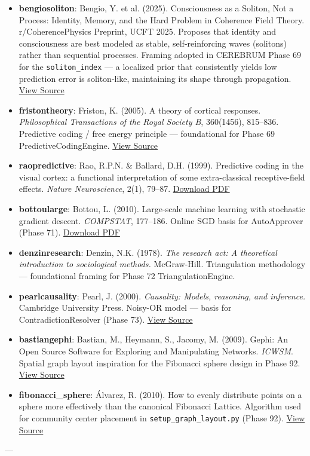 \begin{itemize}
\item \textbf{bengio\-soliton}: Bengio, Y. et al. (2025). Consci\-ousness as a Soliton, Not a Process: Identity, Memory, and the Hard Problem in Coherence Field Theory. r/CoherencePhysics Preprint, UCFT 2025. Proposes that identity and consc\-iousness are best modeled as stable, self-reinforcing waves (solitons) rather than sequential processes. Framing adopted in CEREBRUM Phase 69 for the \texttt{soliton\_index} — a localized prior that consi\-stently yields low prediction error is soliton-like, maintaining its shape through propagation. \href{https://www.reddit.com/r/CoherencePhysics/comments/1sh749z/consciousness_as_a_soliton_not_a_process_identity/}{View Source}
\item \textbf{friston\-theory}: Friston, K. (2005). A theory of cortical responses. \textit{Philos\-ophical Transa\-ctions of the Royal Society B}, 360(1456), 815–836. Predictive coding / free energy principle — found\-ational for Phase 69 PredictiveCodingEngine. \href{https://doi.org/10.1098/rstb.2005.1622}{View Source}
\item \textbf{rao\-predi\-ctive}: Rao, R.P.N. \& Ballard, D.H. (1999). Predictive coding in the visual cortex: a functional inter\-pretation of some extra-classical receptive-field effects. \textit{Nature Neuros\-cience}, 2(1), 79–87. \href{https://www.nature.com/articles/nn0199_79.pdf}{Download PDF}
\item \textbf{bottou\-large}: Bottou, L. (2010). Large-scale machine learning with stochastic gradient descent. \textit{COMPSTAT}, 177–186. Online SGD basis for AutoApprover (Phase 71). \href{https://link.springer.com/content/pdf/10.1007/978-3-7908-2604-3_16.pdf}{Download PDF}
\item \textbf{denzin\-research}: Denzin, N.K. (1978). \textit{The research act: A theoretical intro\-duction to socio\-logical methods.} McGraw-Hill. Triang\-ulation methodology — found\-ational framing for Phase 72 Triang\-ulationEngine.
\item \textbf{pearl\-causality}: Pearl, J. (2000). \textit{Causality: Models, reasoning, and inference.} Cambridge University Press. Noisy-OR model — basis for Contra\-dictionResolver (Phase 73). \href{https://doi.org/10.1017/CBO9780511803161}{View Source}
\item \textbf{bastian\-gephi}: Bastian, M., Heymann, S., Jacomy, M. (2009). Gephi: An Open Source Software for Exploring and Manipu\-lating Networks. \textit{ICWSM}. Spatial graph layout inspiration for the Fibonacci sphere design in Phase 92. \href{https://gephi.org/}{View Source}
\item \textbf{fibonacci\_sphere}: Álvarez, R. (2010). How to evenly distribute points on a sphere more effectively than the canonical Fibonacci Lattice. Algorithm used for community center placement in \texttt{setup\_graph\_layout.py} (Phase 92). \href{https://arxiv.org/abs/0912.4540}{View Source}

\end{itemize}
---

